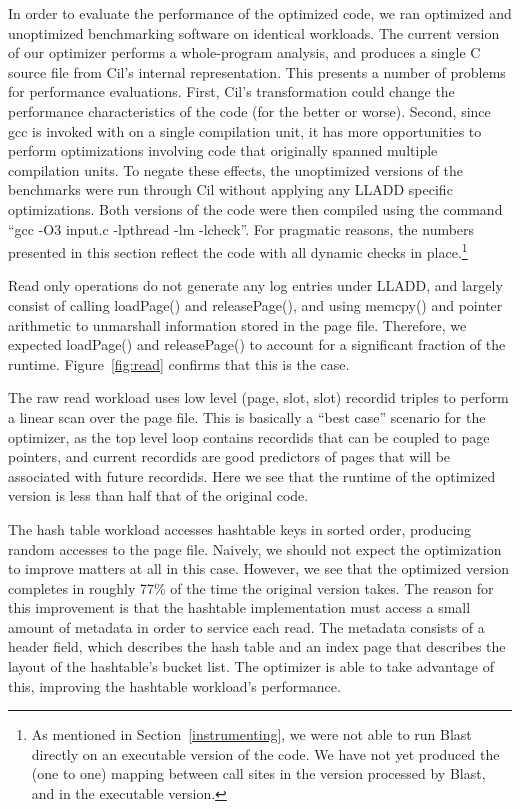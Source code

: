 \documentclass[10pt,letterpaper,twocolumn,english]{article}
\newcommand{\yad}{LLADD\xspace}
\newcommand{\pin}{loadPage()\xspace}
\newcommand{\unpin}{releasePage()\xspace}
\begin{document}
In order to evaluate the performance of the optimized code, we ran
optimized and unoptimized benchmarking software on identical
workloads.  The current version of our optimizer performs a
whole-program analysis, and produces a single C source file from Cil's
internal representation.  This presents a number of problems for
performance evaluations.  First, Cil's transformation could change the
performance characteristics of the code (for the better or worse).
Second, since gcc is invoked with on a single compilation unit, it has
more opportunities to perform optimizations involving code that
originally spanned multiple compilation units.  To negate these
effects, the unoptimized versions of the benchmarks were run through
Cil without applying any \yad specific optimizations.  Both versions
of the code were then compiled using the command ``gcc -O3 input.c
-lpthread -lm -lcheck''.  For pragmatic reasons, the numbers presented
in this section reflect the code with all dynamic checks in
place.\footnote{As mentioned in Section~\ref{instrumenting}, we were
not able to run Blast directly on an executable version of the code.
We have not yet produced the (one to one) mapping between call sites
in the version processed by Blast, and in the executable version.}

Read only operations do not generate any log entries under \yad, and
largely consist of calling \pin and \unpin, and using memcpy() and
pointer arithmetic to unmarshall information stored in the page file.
Therefore, we expected \pin and \unpin to account for a significant
fraction of the runtime.  Figure~\ref{fig:read} confirms that this is
the case.

The raw read workload uses low level (page, slot, slot) recordid
triples to perform a linear scan over the page file.  This is
basically a ``best case'' scenario for the optimizer, as the top level
loop contains recordids that can be coupled to page pointers, and
current recordids are good predictors of pages that will be associated
with future recordids.  Here we see that the runtime of the optimized
version is less than half that of the original code.

The hash table workload accesses hashtable keys in sorted order,
producing random accesses to the page file.  Naively, we should not
expect the optimization to improve matters at all in this case.
However, we see that the optimized version completes in roughly 77\%
of the time the original version takes.  The reason for this
improvement is that the hashtable implementation must access a small
amount of metadata in order to service each read.  The metadata
consists of a header field, which describes the hash table and an
index page that describes the layout of the hashtable's bucket list.
The optimizer is able to take advantage of this, improving the
hashtable workload's performance.
\end{document}
